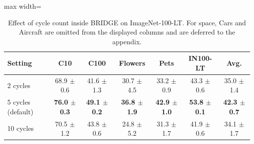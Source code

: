 \begin{table}[t]
\centering
\scriptsize
\setlength{\tabcolsep}{3.5pt}
\caption{Effect of cycle count inside BRIDGE on ImageNet-100-LT. For space, Cars and Aircraft are omitted from the displayed columns and are deferred to the appendix.}
\label{tab:main_ablation_cycles}
\begin{adjustbox}{max width=\textwidth}
\begin{tabular}{l c c c c c c}
\toprule
Setting & C10 & C100 & Flowers & Pets & IN100-LT & Avg. \\
\midrule
2 cycles & 68.9 {\scriptsize$\pm$ 0.6} & 41.6 {\scriptsize$\pm$ 1.3} & 30.7 {\scriptsize$\pm$ 4.5} & 33.2 {\scriptsize$\pm$ 0.9} & 43.3 {\scriptsize$\pm$ 0.6} & 35.0 {\scriptsize$\pm$ 1.4} \\
5 cycles (default) & \textbf{76.0 {\scriptsize$\pm$ 0.3}} & \textbf{49.1 {\scriptsize$\pm$ 0.2}} & \textbf{36.8 {\scriptsize$\pm$ 1.9}} & \textbf{42.9 {\scriptsize$\pm$ 1.0}} & \textbf{53.8 {\scriptsize$\pm$ 0.1}} & \textbf{42.3 {\scriptsize$\pm$ 0.7}} \\
10 cycles & 70.5 {\scriptsize$\pm$ 1.2} & 43.8 {\scriptsize$\pm$ 0.6} & 24.8 {\scriptsize$\pm$ 5.2} & 31.3 {\scriptsize$\pm$ 1.7} & 41.9 {\scriptsize$\pm$ 0.6} & 34.1 {\scriptsize$\pm$ 1.7} \\
\bottomrule
\end{tabular}
\end{adjustbox}
\end{table}
